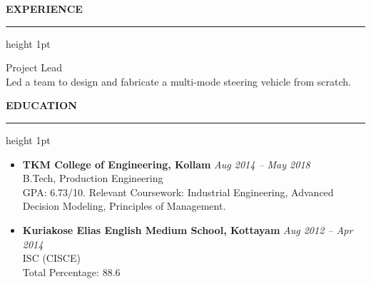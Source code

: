 \documentclass[11pt,letterpaper]{article}
\newenvironment{sectionheader}[1]{
    \vspace{10pt}
    \noindent\textbf{\uppercase{#1}}\vspace{2pt}\\
    \hrule height 1pt \vspace{4pt}
    \begin{itemize}[leftmargin=1.2em, itemsep=2pt, topsep=2pt]
}{
    \end{itemize}
}
\begin{document}
\begin{adjustbox}{minipage=\textwidth,scale only axis=true,center,max height=\textheight}
\begin{sectionheader}{Experience}
    {\small Project Lead} \\
    {\footnotesize Led a team to design and fabricate a multi-mode steering vehicle from scratch.}
\end{sectionheader}\begin{sectionheader}{Education}
  \item \textbf{ TKM College of Engineering, Kollam } \hfill {\emph{ Aug 2014 -- May 2018 }} \\
    B.Tech, Production Engineering \\
    {\footnotesize GPA: 6.73/10. Relevant Coursework: Industrial Engineering, Advanced Decision Modeling, Principles of Management.}
  \item \textbf{ Kuriakose Elias English Medium School, Kottayam } \hfill {\emph{ Aug 2012 -- Apr 2014 }} \\
    ISC (CISCE) \\
    {\footnotesize Total Percentage: 88.6}
\end{sectionheader}\end{adjustbox}
\end{document}
